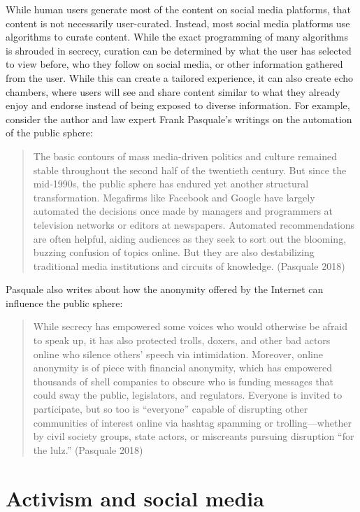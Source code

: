 \documentclass[
  letterpaper,
  DIV=11,
  numbers=noendperiod]{scrreprt}
\begin{document}
While human users generate most of the content on social media
platforms, that content is not necessarily user-curated. Instead, most
social media platforms use algorithms to curate content. While the exact
programming of many algorithms is shrouded in secrecy, curation can be
determined by what the user has selected to view before, who they follow
on social media, or other information gathered from the user. While this
can create a tailored experience, it can also create echo chambers,
where users will see and share content similar to what they already
enjoy and endorse instead of being exposed to diverse information. For
example, consider the author and law expert Frank Pasquale's writings on
the automation of the public sphere:

\begin{quote}
The basic contours of mass media-driven politics and culture remained
stable throughout the second half of the twentieth century. But since
the mid-1990s, the public sphere has endured yet another structural
transformation. Megafirms like Facebook and Google have largely
automated the decisions once made by managers and programmers at
television networks or editors at newspapers. Automated recommendations
are often helpful, aiding audiences as they seek to sort out the
blooming, buzzing confusion of topics online. But they are also
destabilizing traditional media institutions and circuits of knowledge.
(Pasquale 2018)
\end{quote}

Pasquale also writes about how the anonymity offered by the Internet can
influence the public sphere:

\begin{quote}
While secrecy has empowered some voices who would otherwise be afraid to
speak up, it has also protected trolls, doxers, and other bad actors
online who silence others' speech via intimidation. Moreover, online
anonymity is of piece with financial anonymity, which has empowered
thousands of shell companies to obscure who is funding messages that
could sway the public, legislators, and regulators. Everyone is invited
to participate, but so too is ``everyone'' capable of disrupting other
communities of interest online via hashtag spamming or
trolling---whether by civil society groups, state actors, or miscreants
pursuing disruption ``for the lulz.'' (Pasquale 2018)
\end{quote}

\section{Activism and social media}\label{activism-and-social-media}
\end{document}
